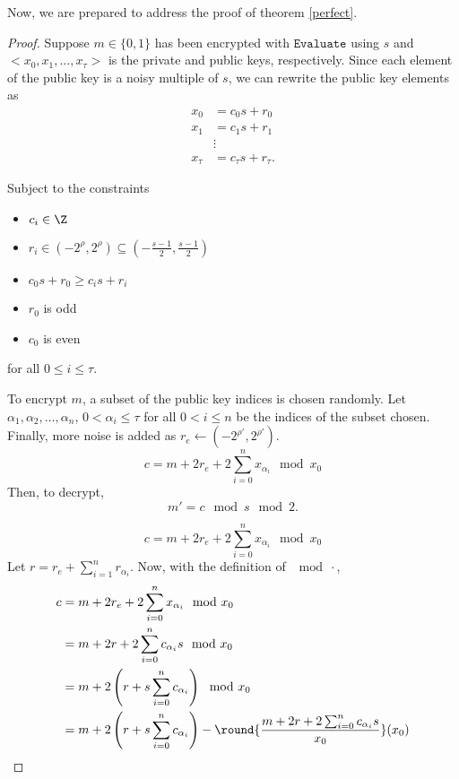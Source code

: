 \documentclass[a4paper,11pt, oneside]{article}
\begin{document}
Now, we are prepared to address the proof of theorem \ref{perfect}.

\begin{proof}

    Suppose $m\in\{0,1\}$ has been encrypted with $\texttt{Evaluate}$ using $s$ and $<x_0,x_1,\dots,x_\tau>$ is the private and public keys, respectively.  Since each element of the public key is a noisy multiple of $s$, we can rewrite the public key elements as 
\begin{align*}
    x_0 &= c_0s+r_0\\
    x_1 &= c_1s+r_1\\
    &\vdots\\
    x_\tau &= c_\tau s+r_\tau.
\end{align*}

Subject to the constraints
\begin{itemize}
    \item $c_i\in\Z$
    \item $r_i\in (-2^\rho,2^\rho)\subseteq \left( -\frac{s-1}{2}, \frac{s-1}{2} \right)$
    \item $c_0s + r_0 \geq c_is+r_i$
    \item $r_0$ is odd
    \item $c_0$ is even
\end{itemize}
for all $ 0 \leq i \leq \tau$.

To encrypt $m$, a subset of the public key indices is chosen randomly.  Let $\alpha_1,\alpha_2,\dots,\alpha_n$, $0 < \alpha_i \leq \tau$ for all $0 < i \leq n$ be the indices of the subset chosen.  Finally, more noise is added as $r_e \leftarrow (-2^{\rho'}, 2^{\rho'})$.
\[c = m + 2r_e + 2\sum_{i=0}^n x_{\alpha_i}\mod{x_0}\]
Then, to decrypt, 
\[m' = c\mod{s}\mod{2}.\]

    \[c = m + 2r_e + 2\sum_{i=0}^n x_{\alpha_i}\mod{x_0}\]
    Let $r = r_e + \sum_{i=1}^nr_{\alpha_i}.$ Now, with the definition of $\mod{\cdot}$,
    \begin{align*}
      c &= m + 2r_e + 2\sum_{i=0}^n x_{\alpha_i}\mod{x_0}\\
        &= m + 2r + 2\sum_{i=0}^n c_{\alpha_i}s\mod{x_0}\\
        &= m + 2\left( r + s\sum_{i=0}^n c_{\alpha_i}\right)\mod{x_0}\\
        &= m + 2\left( r + s\sum_{i=0}^n c_{\alpha_i}\right) - \round{\frac{m + 2r + 2\sum_{i=0}^nc_{\alpha_i}s}{x_0}}(x_0)\\
    \end{align*}


\end{proof}
\end{document}
